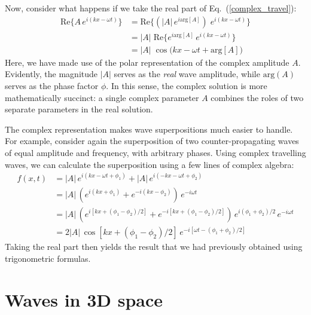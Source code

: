 \documentclass[10pt,a4paper]{article}
\begin{document}
Now, consider what happens if we take the real part of
Eq.~(\ref{complex_travel}):
\begin{align}
  \mathrm{Re}\Big\{A \, e^{i(kx - \omega t)}\Big\}
  &= \mathrm{Re}\Big\{ \left(\big|A\big|\, e^{i\mathrm{arg}[A]}\right) \; e^{i(kx - \omega t)}\Big\} \\
  &= \big|A\big|\; \mathrm{Re}\Big\{ e^{i\mathrm{arg}[A]} \, e^{i(kx - \omega t)}\Big\} \\
  &= \big|A\big|\; \cos\big(kx - \omega t + \mathrm{arg}[A]\big)
\end{align}
Here, we have made use of the polar representation of the complex
amplitude $A$. Evidently, the magnitude $|A|$ serves as the
\emph{real} wave amplitude, while $\mathrm{arg}(A)$ serves as the
phase factor $\phi$. In this sense, the complex solution is more
mathematically succinct: a single complex parameter $A$ combines the
roles of two separate parameters in the real solution.

The complex representation makes wave superpositions much easier to
handle. For example, consider again the superposition of two
counter-propagating waves of equal amplitude and frequency, with
arbitrary phases.  Using complex travelling waves, we can calculate
the superposition using a few lines of complex algebra:
\begin{align}
  f(x,t) &= \big|A\big| \, e^{i(kx - \omega t + \phi_1)}
  + \big|A\big| \, e^{i(-kx - \omega t + \phi_2)} \\
  &= \big|A\big|\, \left(e^{i(kx + \phi_1)}
  + e^{-i(kx - \phi_2)}\right)\, e^{-i\omega t} \\
  &= \big|A\big|\, \left(e^{i[kx + (\phi_1-\phi_2)/2]} + e^{-i[kx + (\phi_1 - \phi_2)/2]}\right)\,
  e^{i(\phi_1 + \phi_2)/2} \,e^{-i\omega t} \\
  &= 2\big|A\big|\, \cos\left[kx + (\phi_1-\phi_2)/2\right] \,
  e^{-i[\omega t -(\phi_1+\phi_2)/2]}
\end{align}
Taking the real part then yields the result that we had previously
obtained using trigonometric formulas.

\section{Waves in 3D space}
\label{waves-in-3d-space}
\end{document}
